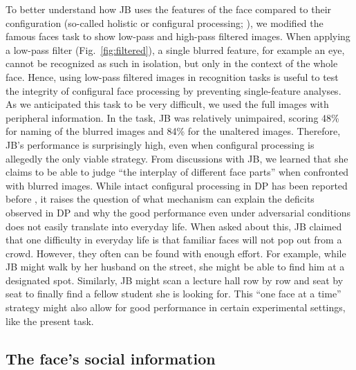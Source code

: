 \documentclass[fleqn,10pt]{SelfArx} %
\begin{document}
To better understand how JB uses the features of the face compared to their configuration (so-called holistic or configural processing; \citet{Maurer_2002}), we modified the famous faces task to show low-pass and high-pass filtered images. When applying a low-pass filter (Fig.~\ref{fig:filtered}), a single blurred feature, for example an eye, cannot be recognized as such in isolation, but only in the context of the whole face. Hence, using low-pass filtered images in recognition tasks is useful to test the integrity of configural face processing by preventing single-feature analyses. As we anticipated this task to be very difficult, we used the full images with peripheral information. In the task, JB was relatively unimpaired, scoring 48\% for naming of the blurred images and 84\% for the unaltered images. Therefore, JB's performance is surprisingly high, even when configural processing is allegedly the only viable strategy. From discussions with JB, we learned that she claims to be able to judge “the interplay of different face parts” when confronted with blurred images. While intact configural processing in DP has been reported before \citep{Duchaine_2000, Le_Grand_2006}, it raises the question of what mechanism can explain the deficits observed in DP and why the good performance even under adversarial conditions does not easily translate into everyday life. When asked about this, JB claimed that one difficulty in everyday life is that familiar faces will not pop out from a crowd. However, they often can be found with enough effort. For example, while JB might walk by her husband on the street, she might be able to find him at a designated spot. Similarly, JB might scan a lecture hall row by row and seat by seat to finally find a fellow student she is looking for. This “one face at a time” strategy might also allow for good performance in certain experimental settings, like the present task.


\subsection*{The face's social information}
\end{document}
